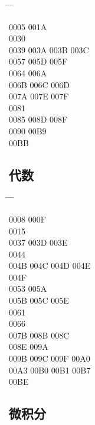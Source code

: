 \documentclass[twoside, twocolumn]{ctexart}
\newenvironment{problist}{
  \begin{center} \ttfamily \begin{tabbing}
      \hspace{50pt} \= \hspace{50pt} \= \hspace{50pt} \= \kill
  }{ \end{tabbing} \end{center} }
\begin{document}
  \begin{problist}
    0005   \> 001A \\ 0030    \\
    0039 \> 003A \> 003B \> 003C \\ 0057  \> 005D \> 005F \\
    0064   \> 006A \\ 006B \> 006C \> 006D  \\
    007A \> 007E \> 007F  \\ 0081    \\
    0085  \> 008D \> 008F \\ 0090   \> 00B9 \\
    00BB \\
  \end{problist}

  \subsection*{代数}

  \begin{problist}
    0008 \> 000F   \\ 0015    \\
    0037 \> 003D \> 003E  \\ 0044    \\
    004B \> 004C \> 004D \> 004E \\ 004F    \\
    0053   \> 005A \\ 005B \> 005C \> 005E  \\
    0061    \\ 0066    \\
    007B  \> 008B \> 008C \\ 008E   \> 009A \\
    009B \> 009C \> 009F \> 00A0 \\ 00A3 \> 00B0 \> 00B1 \> 00B7 \\
    00BE \\
  \end{problist}

  \subsection*{微积分}
\end{document}
